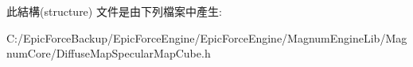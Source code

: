

此結構(structure) 文件是由下列檔案中產生\+:\begin{DoxyCompactItemize}
\item 
C\+:/\+Epic\+Force\+Backup/\+Epic\+Force\+Engine/\+Epic\+Force\+Engine/\+Magnum\+Engine\+Lib/\+Magnum\+Core/Diffuse\+Map\+Specular\+Map\+Cube.\+h\end{DoxyCompactItemize}
